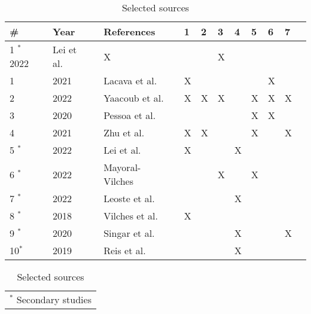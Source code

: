 \begin{table}[h]
\centering
\small
\caption{Selected sources}
\label{table:selected_sources}
\begin{tabularx}{\textwidth}{|l|X|l|l|l|l|l|l|l|l|l|}
\hline
\textbf{\#}  & \textbf{Year} & \textbf{References}                                              & \textbf{1} & \textbf{2} & \textbf{3} & \textbf{4} & \textbf{5}& \textbf{6}& \textbf{7}  \\\hline
1 $^{\ast}$ 2022 & Lei et al.~\cite[]{acceptance_telepresence_robots_2022} & X &  &  & X &  &  &  \\\hline

1            & 2021          & Lacava et al.~\cite[]{cyber_security_issues_in_robotics_2021}    & X          &            &            &            &            & X          &            \\\hline
2            & 2022          & Yaacoub et al.~\cite[]{robotics_cyber_security_2022}             & X          & X          & X          &            & X          & X          & X          \\\hline
3            & 2020          & Pessoa et al.~\cite[]{smart_design_engineering_2020}             &            &            &            &            & X          & X          &            \\\hline
4            & 2021          & Zhu et al.~\cite[]{introduction_to_robot_system_security_2021}   & X          & X          &            &            & X          &           & X         \\\hline
5 $^{\ast}$  & 2022 & Lei et al. ~\cite[]{acceptance_telepresence_robots_2022} & X &  &  & X &  &  &  \\\hline
6 $^{\ast}$  & 2022          & Mayoral-Vilches~\cite[]{robot_security_review_2022}              &            &            & X          &            & X          &            &            \\\hline
7 $^{\ast}$  & 2022          & Leoste et al.~\cite[]{higher_edu_perception_on_tprs_2022}        &            &            &            & X         &            &            &               \\\hline
8 $^{\ast}$  & 2018          & Vilches et al.~\cite[]{robot_security_framework_2018}            & X          &            &            &            &            &            &            \\\hline
9 $^{\ast}$  & 2020          & Singar et al.~\cite[]{role_of_cyber_security_in_higher_edu_2020} &           &            &            & X         &            &            & X         \\\hline
10$^{\ast}$  & 2019          & Reis et al.~\cite[]{telepresence_robots_in_classroom_2019}       &            &            &            & X         &            &            &               \\\hline
\end{tabularx}
\begin{tabularx}{\textwidth}{@{}l}
\footnotesize{$^{\ast}$ Secondary studies}\\
\end{tabularx}
\end{table}

